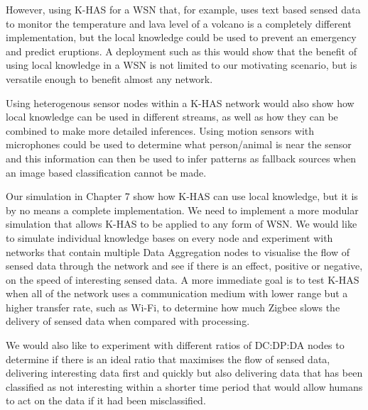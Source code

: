 However, using K-HAS for a WSN that, for example, uses text based sensed data to monitor the temperature and lava level of a volcano is a completely different implementation, but the local knowledge could be used to prevent an emergency and predict eruptions. A deployment such as this would show that the benefit of using local knowledge in a WSN is not limited to our motivating scenario, but is versatile enough to benefit almost any network.

Using heterogenous sensor nodes within a K-HAS network would also show how local knowledge can be used in different streams, as well as how they can be combined to make more detailed inferences.  Using motion sensors with microphones could be used to determine what person/animal is near the sensor and this information can then be used to infer patterns as fallback sources when an image based classification cannot be made.

Our simulation in Chapter 7 show how K-HAS can use local knowledge, but it is by no means a complete implementation.  We need to implement a more modular simulation that allows K-HAS to be applied to any form of WSN. We would like to simulate individual knowledge bases on every node and experiment with networks that contain multiple Data Aggregation nodes to visualise the flow of sensed data through the network and see if there is an effect, positive or negative, on the speed of interesting sensed data. A more immediate goal is to test K-HAS when all of the network uses a communication medium with lower range but a higher transfer rate, such as Wi-Fi, to determine how much Zigbee slows the delivery of sensed data when compared with processing.

We would also like to experiment with different ratios of DC:DP:DA nodes to determine if there is an ideal ratio that maximises the flow of sensed data, delivering interesting data first and quickly but also delivering data that has been classified as not interesting within a shorter time period that would allow humans to act on the data if it had been misclassified.